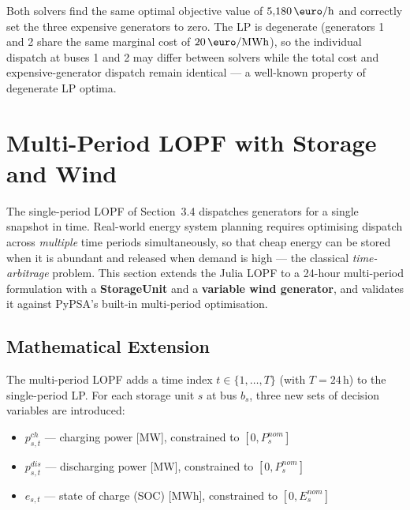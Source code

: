 Both solvers find the same optimal objective value of $5{,}180\,\text{\euro/h}$ and correctly set the three expensive generators to zero. The LP is degenerate (generators 1 and 2 share the same marginal cost of $20\,\text{\euro/MWh}$), so the individual dispatch at buses 1 and 2 may differ between solvers while the total cost and expensive-generator dispatch remain identical --- a well-known property of degenerate LP optima.

\section{Multi-Period LOPF with Storage and Wind}
\label{sec:multiperiod}

The single-period LOPF of Section~3.4 dispatches generators for a single snapshot in time. Real-world energy system planning requires optimising dispatch across \emph{multiple} time periods simultaneously, so that cheap energy can be stored when it is abundant and released when demand is high --- the classical \emph{time-arbitrage} problem. This section extends the Julia LOPF to a 24-hour multi-period formulation with a \textbf{StorageUnit} and a \textbf{variable wind generator}, and validates it against PyPSA's built-in multi-period optimisation.

\subsection{Mathematical Extension}

The multi-period LOPF adds a time index $t \in \{1, \ldots, T\}$ (with $T = 24$\,h) to the single-period LP. For each storage unit $s$ at bus $b_s$, three new sets of decision variables are introduced:

\begin{itemize}
    \item $p_{s,t}^{ch}$ --- charging power [MW], constrained to $[0, P_s^{nom}]$
    \item $p_{s,t}^{dis}$ --- discharging power [MW], constrained to $[0, P_s^{nom}]$
    \item $e_{s,t}$ --- state of charge (SOC) [MWh], constrained to $[0, E_s^{nom}]$
\end{itemize}

